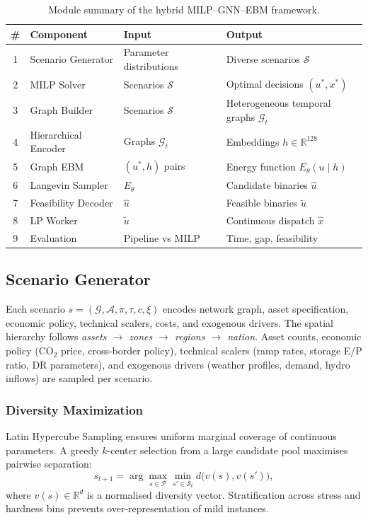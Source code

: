 \documentclass{article}
\begin{document}
\begin{table}[htbp]
\centering\small
\begin{tabular}{clll}
\toprule
\textbf{\#} & \textbf{Component} & \textbf{Input} & \textbf{Output} \\
\midrule
1 & Scenario Generator & Parameter distributions & Diverse scenarios $\mathcal{S}$ \\
2 & MILP Solver & Scenarios $\mathcal{S}$ & Optimal decisions $(u^*, x^*)$ \\
3 & Graph Builder & Scenarios $\mathcal{S}$ & Heterogeneous temporal graphs $\mathcal{G}_t$ \\
4 & Hierarchical Encoder & Graphs $\mathcal{G}_t$ & Embeddings $h \in \mathbb{R}^{128}$ \\
5 & Graph EBM & $(u^*, h)$ pairs & Energy function $E_\theta(u \mid h)$ \\
6 & Langevin Sampler & $E_\theta$ & Candidate binaries $\hat{u}$ \\
7 & Feasibility Decoder & $\hat{u}$ & Feasible binaries $\tilde{u}$ \\
8 & LP Worker & $\tilde{u}$ & Continuous dispatch $\hat{x}$ \\
9 & Evaluation & Pipeline vs MILP & Time, gap, feasibility \\
\bottomrule
\end{tabular}
\caption{Module summary of the hybrid MILP--GNN--EBM framework.}
\label{tab:pipeline_modules}
\end{table}

\subsection{Scenario Generator}
\label{sec:scenario_generator}

Each scenario $s = (\mathcal{G}, \mathcal{A}, \pi, \tau, c, \xi)$ encodes network graph, asset specification, economic policy, technical scalers, costs, and exogenous drivers. The spatial hierarchy follows \emph{assets $\to$ zones $\to$ regions $\to$ nation}. Asset counts, economic policy (CO$_2$ price, cross-border policy), technical scalers (ramp rates, storage E/P ratio, DR parameters), and exogenous drivers (weather profiles, demand, hydro inflows) are sampled per scenario.

\subsubsection{Diversity Maximization}

Latin Hypercube Sampling ensures uniform marginal coverage of continuous parameters. A greedy $k$-center selection from a large candidate pool maximises pairwise separation:
\begin{equation}
s_{t+1} = \arg\max_{s \in \mathcal{P}} \min_{s' \in \mathcal{S}_t} d\bigl(v(s), v(s')\bigr),
\end{equation}
where $v(s) \in \mathbb{R}^d$ is a normalised diversity vector. Stratification across stress and hardness bins prevents over-representation of mild instances.
\end{document}
